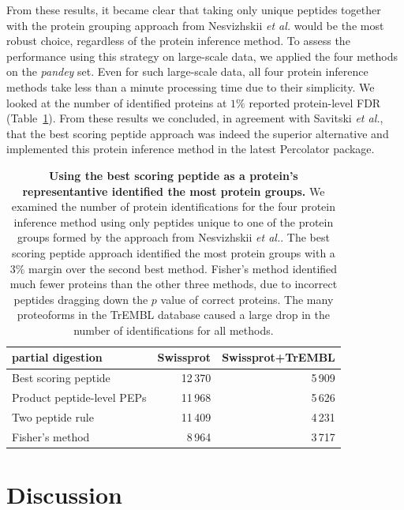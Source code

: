 \documentclass{article}
\begin{document}
From these results, it became clear that taking only unique peptides
together with the protein grouping approach from Nesvizhskii {\em et
al.} would be the most robust choice, regardless of the protein
inference method. To assess the performance using this strategy on
large-scale data, we applied the four methods on the {\em pandey} set.
Even for such large-scale data, all four protein inference methods
take less than a minute processing time due to their simplicity. We
looked at the number of identified proteins at $1\%$ reported
protein-level FDR (Table~\ref{tab:pandey-stats}). From these results
we concluded, in agreement with Savitski {\em et al.}, that the best
scoring peptide approach was indeed the superior alternative and
implemented this protein inference method in the latest Percolator
package. 

\begin{table}[!htp]
  \begin{center}
    \begin{tabular}{|l|r|r|}
    \hline
    partial digestion & Swissprot & Swissprot+TrEMBL\\
    \hline
    Best scoring peptide & 12\,370 & 5\,909\\
    \hline
    Product peptide-level PEPs & 11\,968 & 5\,626\\
    \hline
    Two peptide rule & 11\,409 & 4\,231\\
    \hline
    Fisher's method & 8\,964 & 3\,717\\
    \hline
    \end{tabular}
  \end{center}
  \caption{\label{tab:pandey-stats}\textbf{Using the best scoring
peptide as a protein's representantive identified the most protein
groups.} We examined the number of protein identifications for the
four protein inference method using only peptides unique to one of
the protein groups formed by the approach from Nesvizhskii {\em et
al.}. The best scoring peptide approach identified the most protein
groups with a $3\%$ margin over the second best method. Fisher's
method identified much fewer proteins than the other three methods,
due to incorrect peptides dragging down the $p$ value of correct
proteins. The many proteoforms in the TrEMBL database caused a large
drop in the number of identifications for all methods.}
\end{table}

\section*{Discussion}
\end{document}
